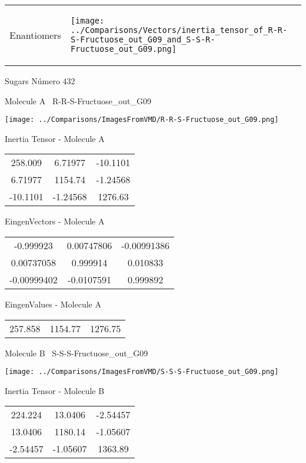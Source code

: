 \vtab[-5mm]
\begin{tabular}{*{2}{m{}}}
\begin{center}
\textcolor{NavyBlue}{\Large Enantiomers}
\end{center}
&
\begin{center}
\texttt{[image: ../Comparisons/Vectors/inertia\_tensor\_of\_R-R-S-Fructuose\_out\_G09\_and\_S-S-R-Fructuose\_out\_G09.png]}
\end{center}
\end{tabular}

 \newpage

\vtab[-3cm]
\begin{center}
{\large Sugars \tab Número 432}
\end{center}
\begin{multicols}{2}
\begin{center}

Molecule A \
R-R-S-Fructuose\_out\_G09

\texttt{[image: ../Comparisons/ImagesFromVMD/R-R-S-Fructuose\_out\_G09.png]}

Inertia Tensor - Molecule A \\
\begin{tabular}{|c c c|}
258.009	 & 	6.71977	 & 	-10.1101	 \\
6.71977	 & 	1154.74	 & 	-1.24568	 \\
-10.1101	 & 	-1.24568	 & 	1276.63
\end{tabular}

\vtab
 EingenVectors - Molecule A     \\
\begin{tabular}{|c c c|}
-0.999923	 & 	0.00747806	 & 	-0.00991386	 \\
0.00737058	 & 	0.999914	 & 	0.010833	 \\
-0.00999402	 & 	-0.0107591	 & 	0.999892
\end{tabular}

\vtab
 EingenValues - Molecule A     \\
\begin{tabular}{|c c c|}
257.858	 & 	1154.77	 & 	1276.75	 \\
\end{tabular}
\columnbreak

Molecule B \
S-S-S-Fructuose\_out\_G09

\texttt{[image: ../Comparisons/ImagesFromVMD/S-S-S-Fructuose\_out\_G09.png]}

Inertia Tensor - Molecule B \\
\begin{tabular}{|c c c|}
224.224	 & 	13.0406	 & 	-2.54457	 \\
13.0406	 & 	1180.14	 & 	-1.05607	 \\
-2.54457	 & 	-1.05607	 & 	1363.89
\end{tabular}


\end{center}
\end{multicols}
